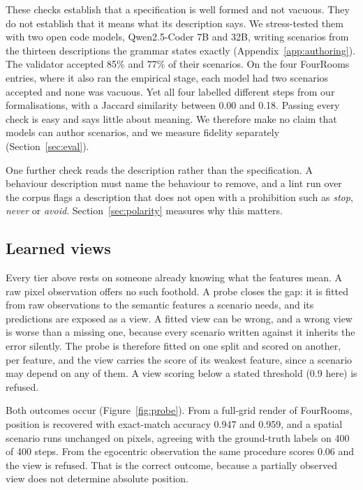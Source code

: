 \documentclass{article}
\begin{document}
These checks establish that a specification is well formed and not
vacuous. They do not establish that it means what its description says. We
stress-tested them with two open code models, Qwen2.5-Coder 7B and 32B,
writing scenarios from the thirteen descriptions the grammar states exactly
(Appendix~\ref{app:authoring}). The validator accepted 85\% and 77\% of
their scenarios. On the four FourRooms entries, where it also ran the
empirical stage, each model had two scenarios accepted and none was
vacuous. Yet all four labelled different steps from our formalisations,
with a Jaccard similarity between 0.00 and 0.18. Passing every check is
easy and says little about meaning. We therefore make no claim that models
can author scenarios, and we measure fidelity separately
(Section~\ref{sec:eval}).

One further check reads the description rather than the specification. A
behaviour description must name the behaviour to remove, and a lint run
over the corpus flags a description that does not open with a prohibition
such as \emph{stop}, \emph{never} or \emph{avoid}. Section~\ref{sec:polarity}
measures why this matters.

\subsection{Learned views}
\label{sec:learned}

Every tier above rests on someone already knowing what the features mean.
A raw pixel observation offers no such foothold. A probe closes the gap:
it is fitted from raw observations to the semantic features a scenario
needs, and its predictions are exposed as a view. A fitted view can be
wrong, and a wrong view is worse than a missing one, because every
scenario written against it inherits the error silently. The probe is
therefore fitted on one split and scored on another, per feature, and the
view carries the score of its weakest feature, since a scenario may
depend on any of them. A view scoring below a stated threshold (0.9 here)
is refused.

Both outcomes occur (Figure~\ref{fig:probe}). From a full-grid render of
FourRooms, position is recovered with exact-match accuracy 0.947 and
0.959, and a spatial scenario runs unchanged on pixels, agreeing with the
ground-truth labels on 400 of 400 steps. From the egocentric observation
the same procedure scores 0.06 and the view is refused. That is the
correct outcome, because a partially observed view does not determine
absolute position.
\end{document}
